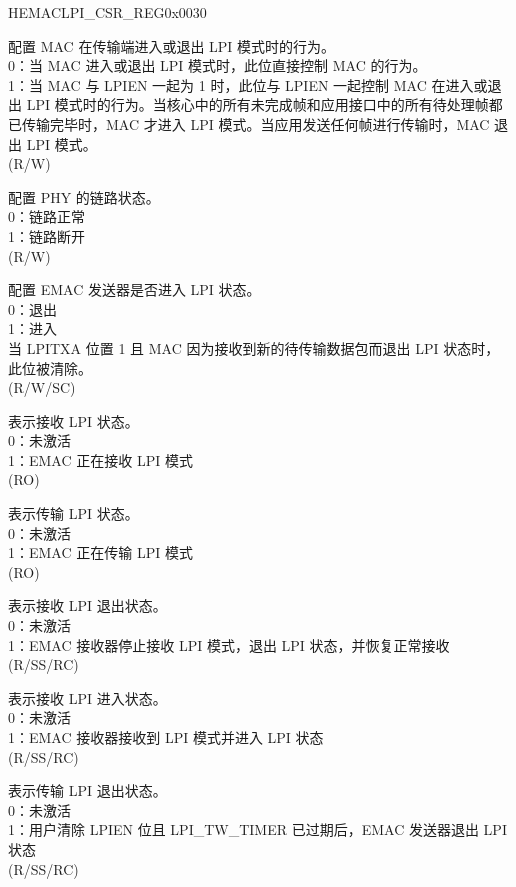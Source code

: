 \begin{register}{H}{EMACLPI\_CSR\_REG}{0x0030}\label{regdesc:EMACLPICSRREG}
%
%
%
%
%
%
%
%
%
%
%
%
%
\regnewline%
\begin{regdesc}\begin{reglist}
\item [LPITXA] 配置 MAC 在传输端进入或退出 LPI 模式时的行为。\\
0：当 MAC 进入或退出 LPI 模式时，此位直接控制 MAC 的行为。\\
1：当 MAC 与 LPIEN 一起为 1 时，此位与 LPIEN 一起控制 MAC 在进入或退出 LPI 模式时的行为。当核心中的所有未完成帧和应用接口中的所有待处理帧都已传输完毕时，MAC 才进入 LPI 模式。当应用发送任何帧进行传输时，MAC 退出 LPI 模式。\\(R/W)
\item [PLS] 配置 PHY 的链路状态。\\
0：链路正常\\
1：链路断开\\ (R/W)
\item [LPIEN] 配置 EMAC 发送器是否进入 LPI 状态。\\
0：退出\\
1：进入\\
当 LPITXA 位置 1 且 MAC 因为接收到新的待传输数据包而退出 LPI 状态时，此位被清除。\\ (R/W/SC)
\item [RLPIST] 表示接收 LPI 状态。\\
0：未激活\\
1：EMAC 正在接收 LPI 模式\\ (RO)
\item [TLPIST] 表示传输 LPI 状态。\\
0：未激活\\
1：EMAC 正在传输 LPI 模式\\ (RO)
\item [RLPIEX] 表示接收 LPI 退出状态。\\
0：未激活\\
1：EMAC 接收器停止接收 LPI 模式，退出 LPI 状态，并恢复正常接收\\ (R/SS/RC)
\item [RLPIEN] 表示接收 LPI 进入状态。\\
0：未激活\\
1：EMAC 接收器接收到 LPI 模式并进入 LPI 状态\\ (R/SS/RC)
\item [TLPIEX] 表示传输 LPI 退出状态。\\
0：未激活\\
1：用户清除 LPIEN 位且 LPI\_TW\_TIMER 已过期后，EMAC 发送器退出 LPI 状态\\ (R/SS/RC)

\item[见下页...]
\end{reglist}\end{regdesc}
\end{register}
